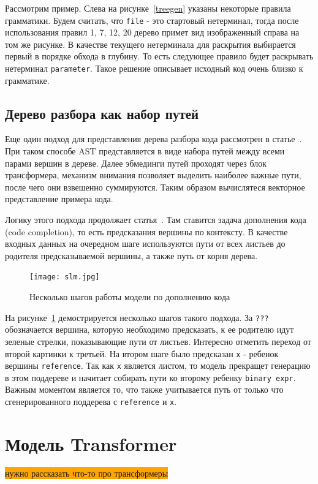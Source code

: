 \documentclass[times,specification,annotation]{itmo-student-thesis}
\begin{document}
Рассмотрим пример. Слева на рисунке~\ref{treegen} указаны некоторые правила грамматики. Будем считать, что \texttt{file} - это стартовый нетерминал, тогда после использования правил 1, 7, 12, 20 дерево примет вид изображенный справа на том же рисунке. В качестве текущего нетерминала для раскрытия выбирается первый в порядке обхода в глубину. То есть следующее правило будет раскрывать нетерминал \texttt{parameter}. Такое решение описывает исходный код очень близко к грамматике.

\subsection{Дерево разбора как набор путей}\label{sec:slm}
Еще один подход для представления дерева разбора кода рассмотрен в статье~\cite{code2vec}. При таком способе AST представляется в виде набора путей между всеми парами вершин в дереве. Далее эбмединги путей проходят через блок трансформера, механизм внимания позволяет выделить наиболее важные пути, после чего они взвешенно суммируются. Таким образом вычислятеся векторное представление примера кода.

Логику этого подхода продолжает статья~\cite{slm}. Там ставится задача дополнения кода (code completion), то есть предсказания вершины по контексту. В качестве входных данных на очередном шаге используются пути от всех листьев до родителя предсказываемой вершины, а также путь от корня дерева.

\begin{figure}[!h]
    \caption{Несколько шагов работы модели по дополнению кода}\label{slm}
    \centering
    \texttt{[image: slm.jpg]}
\end{figure}

На рисунке~\ref{slm} демострируется несколько шагов такого подхода. За \texttt{???} обозначается вершина, которую необходимо предсказать, к ее родителю идут зеленые стрелки, показывающие пути от листьев. Интересно отметить переход от второй картинки к третьей. На втором шаге было предсказан \texttt{x} - ребенок вершины \texttt{reference}. Так как \texttt{x} является листом, то модель прекращет генерацию в этом поддереве и начитает собирать пути ко второму ребенку \texttt{binary expr}. Важным моментом является то, что также учитывается путь от только что сгенерированного поддерева с \texttt{reference} и \texttt{x}.

\section{Модель Transformer}\label{transformers}
\colorbox{orange}{нужно рассказать что-то про трансформеры}
\end{document}
